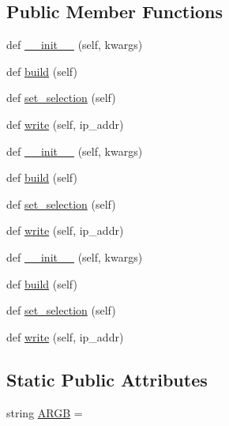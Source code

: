 \subsection*{Public Member Functions}
\begin{DoxyCompactItemize}
\item 
def \hyperlink{classTestingGUI_1_1SetValues_a2e5f962d54f1363a133feec2ca79a6f0}{\+\_\+\+\_\+init\+\_\+\+\_\+} (self, kwargs)
\item 
def \hyperlink{classTestingGUI_1_1SetValues_a27a7794b18e735441d0f90568b9b9070}{build} (self)
\item 
def \hyperlink{classTestingGUI_1_1SetValues_a1ac1751244272aadccd6d300ba58f70a}{set\+\_\+selection} (self)
\item 
def \hyperlink{classTestingGUI_1_1SetValues_abf5d39c7e49932e4d2fd545fecc97300}{write} (self, ip\+\_\+addr)
\item 
def \hyperlink{classTestingGUI_1_1SetValues_a2e5f962d54f1363a133feec2ca79a6f0}{\+\_\+\+\_\+init\+\_\+\+\_\+} (self, kwargs)
\item 
def \hyperlink{classTestingGUI_1_1SetValues_a27a7794b18e735441d0f90568b9b9070}{build} (self)
\item 
def \hyperlink{classTestingGUI_1_1SetValues_a1ac1751244272aadccd6d300ba58f70a}{set\+\_\+selection} (self)
\item 
def \hyperlink{classTestingGUI_1_1SetValues_abf5d39c7e49932e4d2fd545fecc97300}{write} (self, ip\+\_\+addr)
\item 
def \hyperlink{classTestingGUI_1_1SetValues_a2e5f962d54f1363a133feec2ca79a6f0}{\+\_\+\+\_\+init\+\_\+\+\_\+} (self, kwargs)
\item 
def \hyperlink{classTestingGUI_1_1SetValues_a27a7794b18e735441d0f90568b9b9070}{build} (self)
\item 
def \hyperlink{classTestingGUI_1_1SetValues_a1ac1751244272aadccd6d300ba58f70a}{set\+\_\+selection} (self)
\item 
def \hyperlink{classTestingGUI_1_1SetValues_abf5d39c7e49932e4d2fd545fecc97300}{write} (self, ip\+\_\+addr)
\end{DoxyCompactItemize}
\subsection*{Static Public Attributes}
\begin{DoxyCompactItemize}
\item 
string \hyperlink{classTestingGUI_1_1SetValues_a203442ab808fd942b5e86a3b8ec2fc15}{A\+R\+GB} = \textquotesingle{}\textquotesingle{}
\end{DoxyCompactItemize}



